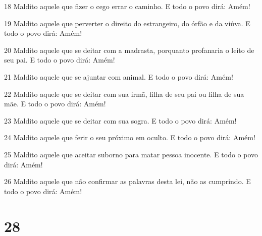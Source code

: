 \par 18 Maldito aquele que fizer o cego errar o caminho. E todo o povo dirá: Amém!
\par 19 Maldito aquele que perverter o direito do estrangeiro, do órfão e da viúva. E todo o povo dirá: Amém!
\par 20 Maldito aquele que se deitar com a madrasta, porquanto profanaria o leito de seu pai. E todo o povo dirá: Amém!
\par 21 Maldito aquele que se ajuntar com animal. E todo o povo dirá: Amém!
\par 22 Maldito aquele que se deitar com sua irmã, filha de seu pai ou filha de sua mãe. E todo o povo dirá: Amém!
\par 23 Maldito aquele que se deitar com sua sogra. E todo o povo dirá: Amém!
\par 24 Maldito aquele que ferir o seu próximo em oculto. E todo o povo dirá: Amém!
\par 25 Maldito aquele que aceitar suborno para matar pessoa inocente. E todo o povo dirá: Amém!
\par 26 Maldito aquele que não confirmar as palavras desta lei, não as cumprindo. E todo o povo dirá: Amém!

\chapter{28}

